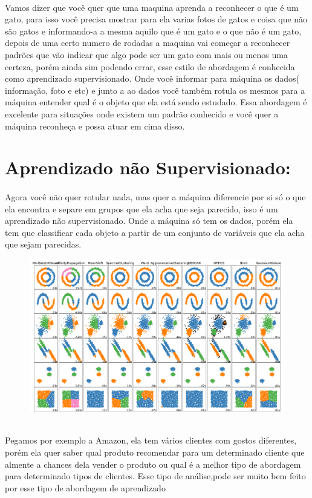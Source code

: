 \documentclass{article}
\begin{document}
    \paragraph{}Vamos dizer que você quer que uma maquina aprenda a reconhecer o que é um gato, para isso você
    precisa mostrar para ela varias fotos de gatos e coisa que não são gatos e informando-a a mesma aquilo que é um gato 
    e o que não é um gato, depois de uma certo numero de rodadas a maquina vai começar a reconhecer padrões que vão indicar que 
    algo pode ser um gato com mais ou menos uma certeza, porém ainda sim podendo errar, 
    esse estilo de abordagem é conhecida como aprendizado supervisionado. Onde você informar para máquina os dados( informação,
     foto e etc) e junto a ao dados você também rotula os mesmos para a máquina entender qual é o objeto que ela está sendo
     estudado.  
    Essa abordagem é excelente para situações onde existem um padrão conhecido e você quer a máquina 
    reconheça e possa atuar em cima disso.

    \newpage

    \section{Aprendizado não Supervisionado:}
    \paragraph{} Agora você não quer rotular nada, mas quer a máquina diferencie por si só o que ela encontra
    e separe em grupos que ela acha que seja parecido, isso é um aprendizado não supervisionado.
    Onde a máquina só tem os dados, porém ela tem que classificar cada objeto a partir de um
    conjunto de variáveis  que ela acha que sejam parecidas. 
    \\
      \begin{figure}[ht]
        \centering
        \includegraphics[scale = 0.25]{classificação de grupos.png}
    \end{figure}
    \\
    Pegamos por exemplo a Amazon,
    ela tem vários clientes com gostos diferentes, porém ela quer saber qual produto recomendar para um determinado
    cliente que almente a chances dela vender o produto ou qual é a melhor tipo de abordagem para determinado 
    tipos de clientes. Esse tipo de análise,pode ser muito bem feito por esse tipo de abordagem de aprendizado   
\end{document}
